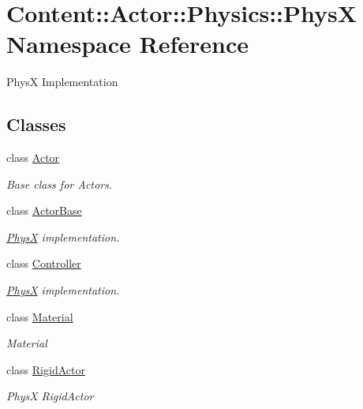 \hypertarget{namespaceContent_1_1Actor_1_1Physics_1_1PhysX}{
\section{Content::Actor::Physics::PhysX Namespace Reference}
\label{namespaceContent_1_1Actor_1_1Physics_1_1PhysX}
}


PhysX Implementation  
\subsection*{Classes}
\begin{DoxyCompactItemize}
\item 
class \hyperlink{classContent_1_1Actor_1_1Physics_1_1PhysX_1_1Actor}{Actor}
\begin{DoxyCompactList}\small\item\em Base class for Actors. \item\end{DoxyCompactList}\item 
class \hyperlink{classContent_1_1Actor_1_1Physics_1_1PhysX_1_1ActorBase}{ActorBase}
\begin{DoxyCompactList}\small\item\em \hyperlink{namespaceContent_1_1Actor_1_1Physics_1_1PhysX}{PhysX} implementation. \item\end{DoxyCompactList}\item 
class \hyperlink{classContent_1_1Actor_1_1Physics_1_1PhysX_1_1Controller}{Controller}
\begin{DoxyCompactList}\small\item\em \hyperlink{namespaceContent_1_1Actor_1_1Physics_1_1PhysX}{PhysX} implementation. \item\end{DoxyCompactList}\item 
class \hyperlink{classContent_1_1Actor_1_1Physics_1_1PhysX_1_1Material}{Material}
\begin{DoxyCompactList}\small\item\em Material \item\end{DoxyCompactList}\item 
class \hyperlink{classContent_1_1Actor_1_1Physics_1_1PhysX_1_1RigidActor}{RigidActor}
\begin{DoxyCompactList}\small\item\em PhysX RigidActor \item\end{DoxyCompactList}\item 

\end{DoxyCompactItemize}

